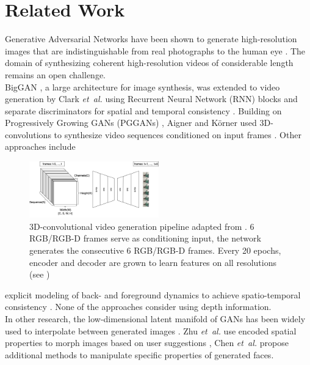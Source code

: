 \documentclass[10pt,twocolumn,letterpaper]{article}
\begin{document}
\section{Related Work}
Generative Adversarial Networks have been shown to generate high-resolution images that are indistinguishable from real photographs to the human eye \cite{Karras2018a, Karras2018}. The domain of synthesizing coherent high-resolution videos of considerable length remains an open challenge.\\%
BigGAN \cite{Brock2018}, a large architecture for image synthesis, was extended to video generation by Clark {\em et\ al.} using Recurrent Neural Network (RNN) blocks and separate discriminators for spatial and temporal consistency \cite{Clark2019}. 
Building on Progressively Growing GANs (PGGANs) \cite{Karras2018}, Aigner and K\"orner used 3D-convolutions to synthesize video sequences conditioned on input frames \cite{Aigner2019}. Other approaches include 
\begin{figure}[H]
	\centering
	\includegraphics[width=0.5\textwidth]{graphics/FutureGAN/FutureGAN.png}
	\caption{3D-convolutional video generation pipeline adapted from \cite{Aigner2019}. 6 RGB/RGB-D frames serve as conditioning input, the network generates the consecutive 6 RGB/RGB-D frames. Every 20 epochs, encoder and decoder are grown to learn features on all resolutions (see \cite{Karras2018})}
	\label{fig:futuregan}
\end{figure}
explicit modeling of back- and foreground dynamics to achieve spatio-temporal consistency \cite{Vondrick2016}. None of the approaches consider using depth information. \\
In other research, the low-dimensional latent manifold of GANs has been widely used to interpolate between generated images \cite{Karras2018}. Zhu {\em et\ al.} use encoded spatial properties to morph images based on user suggestions \cite{Zhu2016}, Chen {\em et\ al.} \cite{Chen2019} propose additional methods to manipulate specific properties of generated faces.
\end{document}
